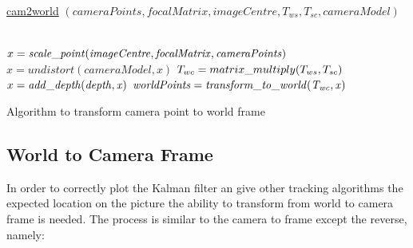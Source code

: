 \documentclass[a4paper,11pt,notitlepage]{article}
\begin{document}
\begin{algorithm}
	\DontPrintSemicolon
	\SetAlgoLined
	\underline{cam2world} $(cameraPoints,focalMatrix,imageCentre,T_{ws},T_{sc},cameraModel)$\;
	
	\texttt{\\}
	$x = \mathit{scale\text{\textunderscore}point(imageCentre,focalMatrix,cameraPoints)}$ 
	$x = \mathit{undistort(cameraModel,x)}$ 
	$T_{wc} = matrix\text{\textunderscore}multiply(T_{ws},T_{sc})$
	\texttt{\\}
	$x = \mathit{add\text{\textunderscore}depth(depth,x)}$ 
	$\mathit{worldPoints} = \mathit{transform\text{\textunderscore}to\text{\textunderscore}world(T_{wc},x)}$ 
	\texttt{\\}
	\caption{Algorithm to transform camera point to world frame}
	\label{alg:weights}
\end{algorithm}

\subsection{World to Camera Frame} \label{w_c_frame}

In order to correctly plot the Kalman filter an give other tracking algorithms the expected location on the picture the ability to transform from world to camera frame is needed. The process is similar to the camera to frame except the reverse, namely:
\end{document}
